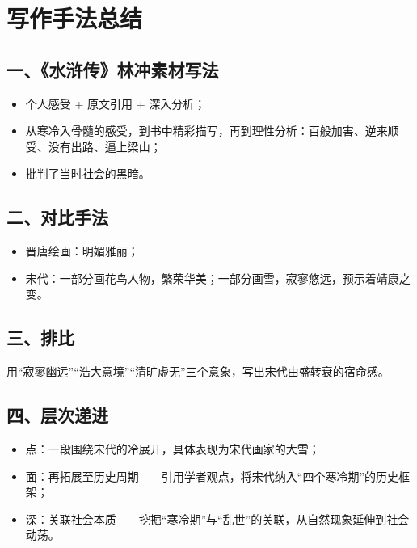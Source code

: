 \newpage

\section*{写作手法总结}

\begin{handoutlayout}

\begin{techbox}
\subsection*{一、《水浒传》林冲素材写法}
\begin{itemize}[leftmargin=*]
    \item 个人感受 + 原文引用 + 深入分析；
    \item 从寒冷入骨髓的感受，到书中精彩描写，再到理性分析：百般加害、逆来顺受、没有出路、逼上梁山；
    \item 批判了当时社会的黑暗。
\end{itemize}
\end{techbox}

\begin{techbox}
\subsection*{二、对比手法}
\begin{itemize}[leftmargin=*]
    \item 晋唐绘画：明媚雅丽；
    \item 宋代：一部分画花鸟人物，繁荣华美；一部分画雪，寂寥悠远，预示着靖康之变。
\end{itemize}
\end{techbox}

\begin{techbox}
\subsection*{三、排比}
用“寂寥幽远”“浩大意境”“清旷虚无”三个意象，写出宋代由盛转衰的宿命感。
\end{techbox}

\switchcolumn

\begin{techbox}
\subsection*{四、层次递进}
\begin{itemize}[leftmargin=*]
    \item 点：一段围绕宋代的冷展开，具体表现为宋代画家的大雪；
    \item 面：再拓展至历史周期——引用学者观点，将宋代纳入“四个寒冷期”的历史框架；
    \item 深：关联社会本质——挖掘“寒冷期”与“乱世”的关联，从自然现象延伸到社会动荡。
\end{itemize}
\end{techbox}


\end{handoutlayout}
